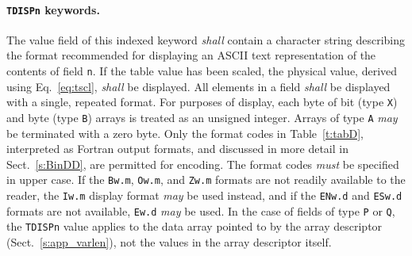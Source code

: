 \documentclass[onecolumn]{aa}
\begin{document}
   \paragraph{{\tt TDISPn} keywords.}  The value field of this
 indexed keyword {\em shall} contain a character string
 describing the format recommended for displaying an ASCII text
 representation of the contents
 of field {\tt n}.  If the table value has been scaled, the
 physical value, derived using Eq.~\ref{eq:tscl}, {\em shall} be
 displayed.  All elements in a field                                         
 {\em shall} be displayed with a single, repeated format. For purposes of
 display, each byte of bit (type {\tt X}) and byte (type {\tt B})
 arrays is treated as an unsigned integer. Arrays of type {\tt A} {\em may} be
 terminated with a zero byte.  Only the format codes in 
 Table~\ref{t:tabD}, interpreted as Fortran \citep{iso04} 
 output formats, and discussed in more detail in Sect.\ \ref{s:BinDD}, 
 are permitted for encoding. The format codes {\em must} be specified in upper case.
 If the {\tt Bw.m}, {\tt Ow.m}, and {\tt Zw.m} formats are 
 not readily available to the reader, the {\tt Iw.m} display format {\em may} be used 
 instead, and if the {\tt ENw.d} and {\tt ESw.d} formats are not available, 
 {\tt Ew.d} {\em may} 
 be used.  In the case of fields of type {\tt P} or {\tt Q}, the {\tt TDISPn} value applies
 to the data array pointed to by the array descriptor (Sect.\ \ref{s:app_varlen}), 
 not the values in the array descriptor itself.
\end{document}
